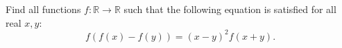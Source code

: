 Find all functions $f\colon\mathbb{R} \rightarrow \mathbb{R}$ such that the following
equation is satisfied for all real $x,y$:
$$f(f(x)-f(y))=(x-y)^2f(x+y).$$